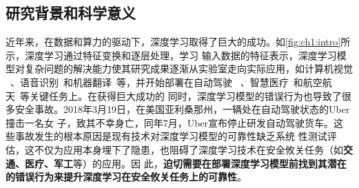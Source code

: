 
\subsection{研究背景和科学意义}



%
近年来，在数据和算力的驱动下，深度学习取得了巨大的成功。如\cref{fig:ch1:intro}所示，深度学习通过特征变换和逐层处理，学习
输入数据的特征表示，深度学习模型对复杂问题的解决能力使其研究成果逐渐从实验室走向实际应用，如计算机视觉
~\cite{dai2021up}、语音识别~\cite{baevski2021unsupervised}和机器翻译~\cite{fan2021beyond}等，并开始部署在自动驾驶
~\cite{feng2021review}、智慧医疗~\cite{liang2021accurate}和航空航天~\cite{julian2019deep}等关键任务上。在获得巨大成功的
同时，深度学习模型的错误行为也导致了很多安全事故。2018年3月19日，在美国亚利桑那州，一辆处在自动驾驶状态的Uber撞击一名女
子，致其不幸身亡，同年7月，Uber宣布停止研发自动驾驶货车。这些事故发生的根本原因是现有技术对深度学习模型的可靠性缺乏系统
性测试评估，这不仅为应用本身埋下了隐患，也阻碍了深度学习技术在安全攸关任务（如\textbf{交通、医疗、军工}等）的应用。因
此，\textbf{迫切需要在部署深度学习模型前找到其潜在的错误行为来提升深度学习在安全攸关任务上的可靠性}。


